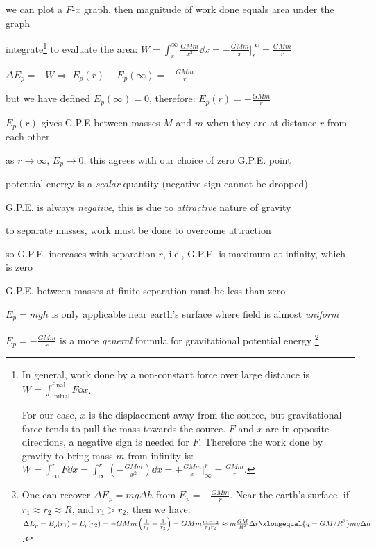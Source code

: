 \documentclass[a4paper,12pt]{book}
\newcommand{\cmt}{}
\newcommand{\RA}{\Rightarrow\;}
\newcommand{\tcbhighmath}[1]{\boxed{#1}}
\newcommand{\cmt}{}
\begin{document}
we can plot a $F$-$x$ graph, then magnitude of work done equals area under the graph

integrate\footnote{In general, work done by a non-constant force over large distance is $W = \int_\text{initial}^\text{final} F \dd x $.
	
For our case, $x$ is the displacement away from the source, but gravitational force tends to pull the mass towards the source. $F$ and $x$ are in opposite directions, a negative sign is needed for $F$. Therefore the work done by gravity to bring mass $m$ from infinity is: $W = \int_\infty^r F \dd x = \int_\infty^r \left(-\frac{GMm}{x^2}\right)\dd x = +\frac{GMm}{x} \Bigg|_\infty^r = \frac{GMm}{r}$.} to evaluate the area: $W = \int_r^\infty \frac{GMm}{x^2} \dd x = - \frac{GMm}{x}\Bigg|^\infty_r = \frac{GMm}{r}$

$\Delta E_p = -W \RA E_p(r) - E_p(\infty) = - \frac{GMm}{r}$

but we have defined $E_p(\infty)=0$, therefore: $\tcbhighmath{E_p(r)= -\frac{GMm}{r}}$

$E_p(r)$ gives G.P.E between masses $M$ and $m$ when they are at distance $r$ from each other

\cmt as $r \to \infty$, $E_p \to 0$, this agrees with our choice of zero G.P.E. point

\cmt potential energy is a \emph{scalar} quantity (negative sign cannot be dropped)

\cmt G.P.E. is always \emph{negative}, this is due to \emph{attractive} nature of gravity

to separate masses, work must be done to overcome attraction

so G.P.E. increases with separation $r$, i.e., G.P.E. is maximum at infinity, which is zero

G.P.E. between masses at finite separation must be less than zero

\cmt $E_p=mgh$ is only applicable near earth's surface where field is almost \emph{uniform}

$E_p =-\frac{GMm}{r}$ is a more \emph{general} formula for gravitational potential energy
\footnote{One can recover $\Delta E_p=mg\Delta h$ from $E_p=-\frac{GMm}{r}$. Near the earth's surface, if $r_1\approx r_2\approx R$, and $r_1>r_2$, then we have: $\Delta E_p = E_p(r_1) - E_p(r_2) = -GMm\left(\frac{1}{r_1}-\frac{1}{r_2}\right) = GMm \frac{r_1-r_2}{r_1r_2} \approx m \frac{GM}{R^2} \Delta r \xlongequal{g=GM/R^2} mg\Delta h$.}

	
\end{document}
